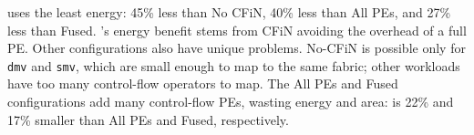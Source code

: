 \riptide uses the least energy: 45\% less than No CFiN, 40\% less than All PEs, and 27\% less than Fused.
% 
\riptide's energy benefit stems from CFiN avoiding the overhead of a full PE.
%
Other configurations also have unique problems.
% 
No-CFiN is possible only for {\tt dmv} and {\tt smv}, which are small enough to map to the
same \riptide fabric; other workloads have too many control-flow operators to map.
% 
The All PEs and Fused configurations add many control-flow PEs, wasting energy and area:
% 
\riptide is 22\% and 17\% smaller than All PEs and Fused, respectively.




